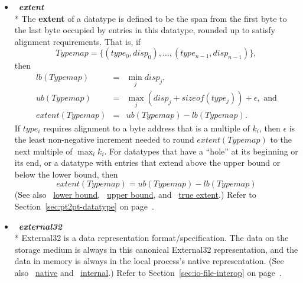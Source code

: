 \begin{itemize}
\label{glossary:extent}
\item  ~\hypertarget{glossary:extent}{\emph{\textbf{extent}}} \\*
The {\bf extent} of a datatype is defined to
be the span from the first byte to the last byte occupied by entries in this
datatype, rounded up to satisfy alignment requirements.
That is, if
\[
Typemap = \{ (type_0,disp_0), ..., (type_{n-1}, disp_{n-1}) \} ,
\]
then
\begin{eqnarray}
lb(Typemap) & = & \min_j disp_j , \nonumber \\
ub(Typemap) & = & \max_j (disp_j + sizeof(type_j)) + \epsilon , \mbox{ and}
\nonumber \\ extent(Typemap) & = & ub(Typemap) -lb(Typemap).
\end{eqnarray}
If $type_i$ requires alignment to a byte address that 
is
a multiple
of $k_i$,
then $\epsilon$ is the least non-negative increment needed to round
$extent(Typemap)$ to the next multiple of $\max_i k_i$.
For datatypes that 
have a ``hole'' at its beginning or its end, or a datatype with
entries that extend above the upper bound or below the lower bound, then
\label{eq:pt2pt-extent}
\[
extent(Typemap) = ub(Typemap) - lb(Typemap)
\]
(See also ~\hyperlink{glossary:lower_bound}{lower bound}, ~\hyperlink{glossary:upper_bound}{upper bound}, and ~\hyperlink{glossary:true_extent}{true extent}.)
Refer to Section~\ref{sec:pt2pt-datatype} on page~\pageref{sec:pt2pt-datatype}.

\label{glossary:external32}
\item  ~\hypertarget{glossary:external32}{\emph{\textbf{external32}}} \\*
External32 is a data representation format/specification.
The data on the storage
medium is always in this canonical External32 representation, and
the data in memory
is always in the local process's native representation.
(See also ~\hyperlink{glossary:native}{native} and ~\hyperlink{glossary:internal}{internal}.)
Refer to Section~\ref{sec:io-file-interop} on page~\pageref{sec:io-file-interop}.


\end{itemize}
